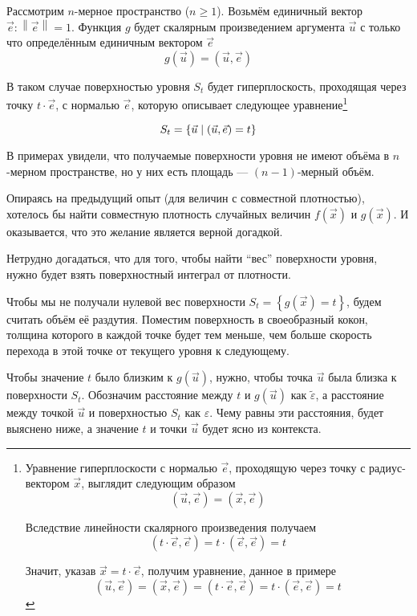 \begin{example}
  Рассмотрим $n$-мерное пространство ($n \ge 1$).
  Возьмём единичный вектор $\vec{e}: \left\| \vec{e} \right\| = 1$.
  Функция $g$ будет скалярным произведением аргумента $\vec{u}$
  с только что определённым единичным вектором $\vec{e}$
      $$g\left( \vec{u} \right) = \left( \vec{u}, \vec{e} \right)$$

  В таком случае поверхностью уровня $S_t$ будет гиперплоскость,
  проходящая через точку $t \cdot \vec{e}$, с нормалью $\vec{e}$,
  которую описывает следующее уравнение\footnote{
      Уравнение гиперплоскости с нормалью $\vec{e}$,
      проходящую через точку с радиус-вектором $\vec{x}$,
      выглядит следующим образом
      $$\left( \vec{u}, \vec{e} \right) = \left( \vec{x}, \vec{e} \right)$$

      Вследствие линейности скалярного произведения получаем
      $$\left( t \cdot \vec{e}, \vec{e} \right)
      = t \cdot \left( \vec{e}, \vec{e} \right) = t$$

      Значит, указав $\vec{x} = t \cdot \vec{e}$, получим уравнение,
      данное в примере
      $$\left( \vec{u}, \vec{e} \right)
      = \left( \vec{x}, \vec{e} \right)
      = \left( t \cdot \vec{e}, \vec{e} \right)
      = t \cdot \left( \vec{e}, \vec{e} \right) = t$$}

  $$S_t = \left\{ \vec{u} \;\middle|\; \left( \vec{u}, \vec{e} \right) = t \right\}$$
\end{example}

В примерах увидели, что получаемые поверхности уровня не имеют объёма
в $n$-мерном пространстве, но у них есть площадь --- $(n-1)$-мерный объём.

Опираясь на предыдущий опыт (для величин с совместной плотностью),
хотелось бы найти совместную плотность случайных величин
$f\left( \vec{x} \right)$ и $g\left( \vec{x} \right)$.
И оказывается, что это желание является верной догадкой.

Нетрудно догадаться, что для того, чтобы найти ``вес'' поверхности уровня,
нужно будет взять поверхностный интеграл от плотности.

Чтобы мы не получали нулевой вес поверхности
$S_t = \left\{ g\left( \vec{x} \right) = t \right\}$,
будем считать объём её раздутия.
Поместим поверхность в своеобразный кокон,
толщина которого в каждой точке будет тем меньше,
чем больше скорость перехода в этой точке от текущего уровня к следующему.

Чтобы значение $t$ было близким к $g\left( \vec{u} \right)$,
нужно, чтобы точка $\vec{u}$ была близка к поверхности $S_t$.
Обозначим расстояние между $t$ и $g\left( \vec{u} \right)$
как $\tilde{\varepsilon}$,
а расстояние между точкой $\vec{u}$ и поверхностью $S_t$
как $\varepsilon$. Чему равны эти расстояния, будет выяснено ниже,
а значение $t$ и точки $\vec{u}$ будет ясно из контекста.

